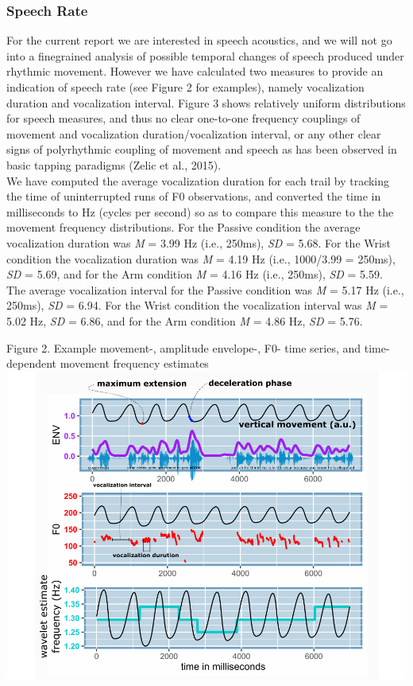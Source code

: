 \documentclass[
  man,floatsintext]{apa6}
\begin{document}
\hypertarget{speech-rate}{%
\subsubsection{Speech Rate}\label{speech-rate}}

For the current report we are interested in speech acoustics, and we will not go into a finegrained analysis of possible temporal changes of speech produced under rhythmic movement. However we have calculated two measures to provide an indication of speech rate (see Figure 2 for examples), namely vocalization duration and vocalization interval. Figure 3 shows relatively uniform distributions for speech measures, and thus no clear one-to-one frequency couplings of movement and vocalization duration/vocalization interval, or any other clear signs of polyrhythmic coupling of movement and speech as has been observed in basic tapping paradigms (Zelic et al., 2015).\\
We have computed the average vocalization duration for each trail by tracking the time of uninterrupted runs of F0 observations, and converted the time in milliseconds to Hz (cycles per second) so as to compare this measure to the the movement frequency distributions. For the Passive condition the average vocalization duration was \emph{M} = 3.99 Hz (i.e., 250ms), \emph{SD} = 5.68. For the Wrist condition the vocalization duration was \emph{M} = 4.19 Hz (i.e., 1000/3.99 = 250ms), \emph{SD} = 5.69, and for the Arm condition \emph{M} = 4.16 Hz (i.e., 250ms), \emph{SD} = 5.59.\\
The average vocalization interval for the Passive condition was \emph{M} = 5.17 Hz (i.e., 250ms), \emph{SD} = 6.94. For the Wrist condition the vocalization interval was \emph{M} = 5.02 Hz, \emph{SD} = 6.86, and for the Arm condition \emph{M} = 4.86 Hz, \emph{SD} = 5.76.

Figure 2. Example movement-, amplitude envelope-, F0- time series, and time-dependent movement frequency estimates
\includegraphics{GS_physics_in_fluid_speech_files/figure-latex/plot_example_time_series-1.pdf}
\end{document}
